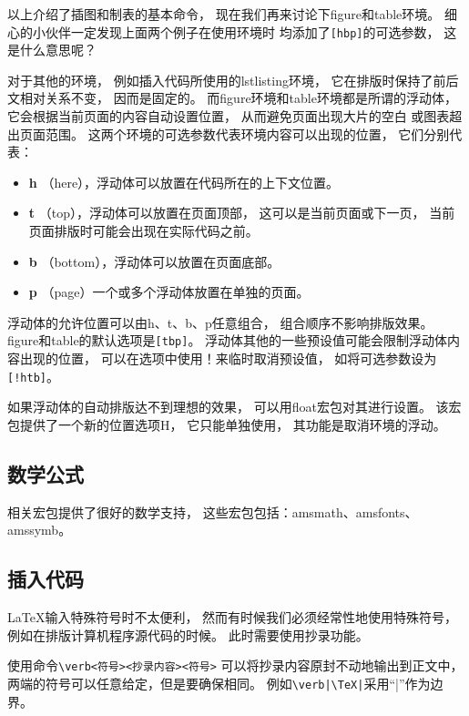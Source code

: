 \documentclass{ctexart}
\numberwithin{equation}{section}			%
\begin{document}
	以上介绍了插图和制表的基本命令，
	现在我们再来讨论下figure和table环境。
	细心的小伙伴一定发现上面两个例子在使用环境时
	均添加了\verb|[hbp]|的可选参数，
	这是什么意思呢？
	
	对于其他的环境，
	例如插入代码所使用的lstlisting环境，
	它在排版时保持了前后文相对关系不变，
	因而是固定的。
	而figure环境和table环境都是所谓的浮动体，
	它会根据当前页面的内容自动设置位置，
	从而避免页面出现大片的空白
	或图表超出页面范围。
	这两个环境的可选参数代表环境内容可以出现的位置，
	它们分别代表：
	
	\begin{itemize}
		\item \textbf{h} （here），浮动体可以放置在代码所在的上下文位置。
		\item \textbf{t} （top），浮动体可以放置在页面顶部，
			这可以是当前页面或下一页，
			当前页面排版时可能会出现在实际代码之前。
		\item \textbf{b} （bottom），浮动体可以放置在页面底部。
		\item \textbf{p} （page）一个或多个浮动体放置在单独的页面。
	\end{itemize}

	浮动体的允许位置可以由h、t、b、p任意组合，
	组合顺序不影响排版效果。
	figure和table的默认选项是\verb|[tbp]|。
	浮动体其他的一些预设值可能会限制浮动体内容出现的位置，
	可以在选项中使用！来临时取消预设值，
	如将可选参数设为\verb|[!htb]|。
	
	如果浮动体的自动排版达不到理想的效果，
	可以用float宏包对其进行设置。
	该宏包提供了一个新的位置选项H，
	它只能单独使用，
	其功能是取消环境的浮动。
	
	\subsection{数学公式}
	\AmS 相关宏包提供了很好的数学支持，
	这些宏包包括：amsmath、amsfonts、amssymb。
	
	
	\subsection{插入代码}
	\LaTeX 输入特殊符号时不太便利，
	然而有时候我们必须经常性地使用特殊符号，
	例如在排版计算机程序源代码的时候。
	此时需要使用抄录功能。
	
	使用命令\verb|\verb<符号><抄录内容><符号>|
	可以将抄录内容原封不动地输出到正文中，
	两端的符号可以任意给定，但是要确保相同。
	例如\verb~\verb|\TeX|~采用“|”作为边界。
	
\end{document}
